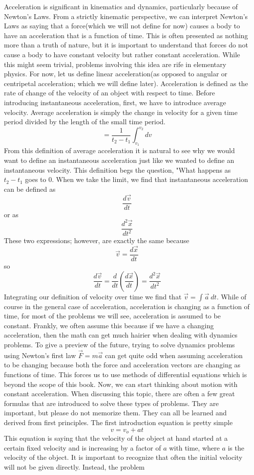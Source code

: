 \documentclass{article}[gray]
\numberwithin{equation}{subsection}
\begin{document}
Acceleration is significant in kinematics and dynamics, particularly 
because of Newton's Laws. From a strictly kinematic perspective, we can interpret Newton’s Laws as saying that a force(which we will not define for now) causes a body to have an acceleration that is a function of time. This is often presented as nothing more than a truth of nature, but it is important to understand that forces do not cause a body to have constant velocity but rather constant acceleration. While this might seem trivial, problems involving this idea are rife in elementary physics. For now, let us define linear acceleration(as opposed to angular or centripetal acceleration; which we will define later). Acceleration is defined as the rate of change of the velocity of an object with respect to time. Before introducing instantaneous acceleration, first, we have to introduce average velocity. Average acceleration is simply the change in velocity for a given time period divided by the length of the small time period. \begin{equation} = \frac{1}{t_2-t_1} \int_{v_1}^{v_2} dv\end{equation} From this definition of average acceleration it is natural to see why we would want to define an instantaneous acceleration just like we wanted to define an instantaneous velocity. This definition begs the question, "What happens as $t_2-t_1$ goes to 0. When we take the limit, we find that instantaneous acceleration can be defined as $$\frac{d\vec{v}}{dt}$$ or as $$\frac{d^2\vec{x}}{dt^2}$$ These two expressions; however, are exactly the same because $$\vec{v}= \frac{d\vec{x}}{dt}$$ so $$\frac{d\vec{v}}{dt} = \frac{d}{dt}\left(\frac{d\vec{x}}{dt}\right) = \frac{d^2\vec{x}}{dt^2}$$ Integrating our definition of velocity over time we find that $\vec{v} = \int \vec{a} \ dt$. While of course in the general case of acceleration, acceleration is changing as a function of time, for most of the problems we will see, acceleration is assumed to be constant. Frankly, we often assume this because if we have a changing acceleration, then the math can get much hairier when dealing with dynamics problems. To give a preview of the future, trying to solve dynamics problems using Newton's first law $\vec{F}=m\vec{a}$ can get quite odd when assuming acceleration to be changing because both the force and acceleration vectors are changing as functions of time. This forces us to use methods of differential equations which is beyond the scope of this book. Now, we can start thinking about motion with constant acceleration. When discussing this topic, there are often a few great formulas that are introduced to solve these types of problems. They are important, but please do not memorize them. They can all be learned and derived from first principles. The first introduction equation is pretty simple \begin{equation} v=v_o+at\end{equation} This equation is saying that the velocity of the object at hand started at a certain fixed velocity and is increasing by a factor of $a$ with time, where $a$ is the velocity of the object. It is important to recognize that often the initial velocity will not be given directly. Instead, the problem 
\end{document}
